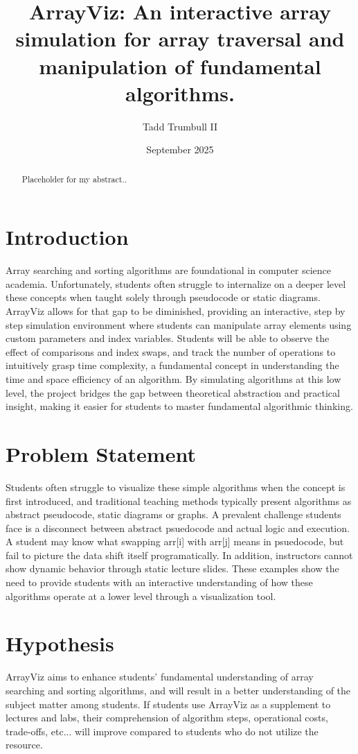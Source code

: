 \documentclass{article}
\title{ArrayViz: An interactive array simulation for array traversal and manipulation of fundamental algorithms.}
\author{Tadd Trumbull II}
\date{September 2025}
\begin{document}
\maketitle

\begin{abstract}
Placeholder for my abstract..
\end{abstract}

\section{Introduction}
Array searching and sorting algorithms are foundational in computer science academia. Unfortunately, students often struggle to internalize on a deeper level these concepts when taught solely through pseudocode or static diagrams. ArrayViz allows for that gap to be diminished, providing an interactive, step by step simulation environment where students can manipulate array elements using custom parameters and index variables. Students will be able to observe the effect of comparisons and index swaps, and track the number of operations to intuitively grasp time complexity, a fundamental concept in understanding the time and space efficiency of an algorithm. By simulating algorithms at this low level, the project bridges the gap between theoretical abstraction and practical insight, making it easier for students to master fundamental algorithmic thinking. 
\section{Problem Statement}
Students often struggle to visualize these simple algorithms when the concept is first introduced, and traditional teaching methods typically present algorithms as abstract pseudocode, static diagrams or graphs. A prevalent challenge students face is a disconnect between abstract psuedocode and actual logic and execution. A student may know what swapping arr[i] with arr[j] means in psuedocode, but fail to picture the data shift itself programatically. In addition, instructors cannot show dynamic behavior through static lecture slides. These examples show the need to provide students with an interactive understanding of how these algorithms operate at a lower level through a visualization tool.
\section{Hypothesis}
ArrayViz aims to enhance students' fundamental understanding of array searching and sorting algorithms, and will result in a better understanding of the subject matter among students. If students use ArrayViz as a supplement to lectures and labs, their comprehension of algorithm steps, operational costs, trade-offs, etc... will improve compared to students who do not utilize the resource.
\end{document}
